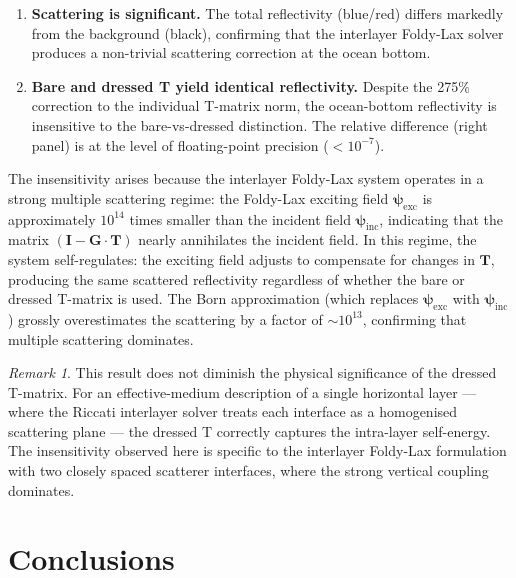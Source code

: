 \documentclass[11pt,a4paper]{article}
\theoremstyle{plain}
\theoremstyle{remark}
\newtheorem{remark}{Remark}
\begin{document}
\begin{enumerate}[nosep]
\item \textbf{Scattering is significant.}  The total reflectivity
  (blue/red) differs markedly from the background (black), confirming
  that the interlayer Foldy-Lax solver produces a non-trivial scattering
  correction at the ocean bottom.

\item \textbf{Bare and dressed T yield identical reflectivity.}
  Despite the 275\% correction to the individual T-matrix norm, the
  ocean-bottom reflectivity is insensitive to the bare-vs-dressed
  distinction.  The relative difference (right panel) is at the level
  of floating-point precision ($< 10^{-7}$).
\end{enumerate}

The insensitivity arises because the interlayer Foldy-Lax system
operates in a strong multiple scattering regime: the Foldy-Lax
exciting field $\bm{\psi}_{\mathrm{exc}}$ is approximately $10^{14}$
times smaller than the incident field $\bm{\psi}_{\mathrm{inc}}$,
indicating that the matrix $(\mathbf{I} - \mathbf{G} \cdot \mathbf{T})$
nearly annihilates the incident field.  In this regime, the system
self-regulates: the exciting field adjusts to compensate for changes in
$\mathbf{T}$, producing the same scattered reflectivity regardless of
whether the bare or dressed T-matrix is used.  The Born approximation
(which replaces $\bm{\psi}_{\mathrm{exc}}$ with
$\bm{\psi}_{\mathrm{inc}}$) grossly overestimates the scattering by a
factor of ${\sim}10^{13}$, confirming that multiple scattering
dominates.

\begin{remark}
This result does not diminish the physical significance of the dressed
T-matrix.  For an effective-medium description of a single horizontal
layer --- where the Riccati interlayer solver treats each interface as a
homogenised scattering plane --- the dressed T correctly captures the
intra-layer self-energy.  The insensitivity observed here is specific to
the interlayer Foldy-Lax formulation with two closely spaced scatterer
interfaces, where the strong vertical coupling dominates.
\end{remark}

\section{Conclusions}\label{sec:conclusions}
\end{document}
